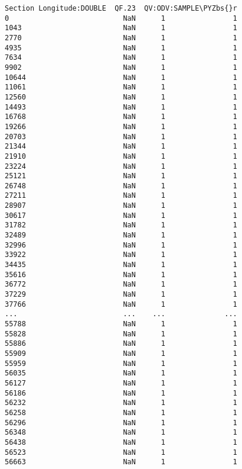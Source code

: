 \documentclass[a4paper,11pt,final]{article}
\def\PYZbs{\char`\\}
\begin{document}
\begin{Verbatim}[commandchars=\\\{\},frame=leftline,fontsize=\small, xleftmargin=0.5em]
       Section Longitude:DOUBLE  QF.23  QV:ODV:SAMPLE\PYZbs{}r
0                           NaN      1                1
1043                        NaN      1                1
2770                        NaN      1                1
4935                        NaN      1                1
7634                        NaN      1                1
9902                        NaN      1                1
10644                       NaN      1                1
11061                       NaN      1                1
12560                       NaN      1                1
14493                       NaN      1                1
16768                       NaN      1                1
19266                       NaN      1                1
20703                       NaN      1                1
21344                       NaN      1                1
21910                       NaN      1                1
23224                       NaN      1                1
25121                       NaN      1                1
26748                       NaN      1                1
27211                       NaN      1                1
28907                       NaN      1                1
30617                       NaN      1                1
31782                       NaN      1                1
32489                       NaN      1                1
32996                       NaN      1                1
33922                       NaN      1                1
34435                       NaN      1                1
35616                       NaN      1                1
36772                       NaN      1                1
37229                       NaN      1                1
37766                       NaN      1                1
...                         ...    ...              ...
55788                       NaN      1                1
55828                       NaN      1                1
55886                       NaN      1                1
55909                       NaN      1                1
55959                       NaN      1                1
56035                       NaN      1                1
56127                       NaN      1                1
56186                       NaN      1                1
56232                       NaN      1                1
56258                       NaN      1                1
56296                       NaN      1                1
56348                       NaN      1                1
56438                       NaN      1                1
56523                       NaN      1                1
56663                       NaN      1                1

\end{Verbatim}
\end{document}
